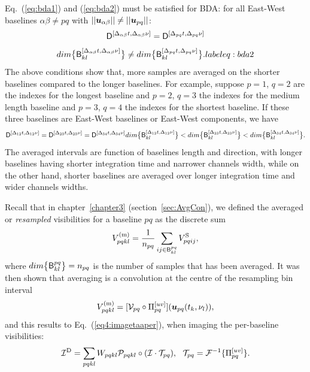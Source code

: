 \documentclass[useAMS,usenatbib]{mn2e}
\begin{document}
Eq.~(\ref{eq:bda1}) and (\ref{eq:bda2}) must be satisfied for BDA: for all East-West baselines 
$\alpha \beta \neq pq$ with $||\bmath{u}_{\alpha \beta}||\neq ||\bmath{u}_{pq}||$:
\begin{equation}
\mathsf{D}^{[\Delta_{\alpha \beta} t, \Delta_{\alpha \beta} \nu]}=\mathsf{D}^{[\Delta_{pq} t, \Delta_{pq} \nu]} \label{eq:bda1}
\end{equation}
\newcommand{\Bdaph}{\mathsf{B}^{[\Delta_{\alpha \beta} t, \Delta_{\alpha \beta} \nu]}}
\begin{equation}
dim \big\{\Bdaph_{kl}\big\} \neq dim \big\{\Bda_{kl}\big\}.label{eq:bda2}
\end{equation}
The above conditions show that, more samples are averaged on the shorter baselines compared to the longer baselines.
For example, suppose $p=1$, $q=2$ are the indexes for the longest baseline and $p=2$, $q=3$ the indexes for the 
medium length baseline
and $p=3$, $q=4$ the indexes for the shortest baseline. If these three baselines are East-West baselines or 
East-West components, we have
\newcommand{\Dbdlong}{\mathsf{D}^{[\Delta_{12} t, \Delta_{12} \nu]}}
\newcommand{\Dbdmedium}{\mathsf{D}^{[\Delta_{23} t, \Delta_{23} \nu]}}
\newcommand{\Dbdshort}{\mathsf{D}^{[\Delta_{34} t, \Delta_{34} \nu]}}
\newcommand{\Bdaphlong}{\mathsf{B}^{[\Delta_{12} t, \Delta_{12} \nu]}}
\newcommand{\Bdaphmedium}{\mathsf{B}^{[\Delta_{23} t, \Delta_{23} \nu]}}
\newcommand{\Bdaphshort}{\mathsf{B}^{[\Delta_{34} t, \Delta_{34} \nu]}}
\begin{equation}
\Dbdlong=\Dbdmedium\\
	=\Dbdshort\\
dim \big\{\Bdaphlong_{kl} \big\}< dim \big\{\Bdaphmedium_{kl}\big\} \\
		    <dim \big\{\Bdaphshort_{kl}\big\}.
\end{equation}
The averaged intervals are function of baselines length and direction, with longer baselines having shorter integration time and
narrower channels width, while on the other hand, shorter baselines are averaged over longer integration time and wider channels widths.

Recall that in chapter~\ref{chapter3} (section~\ref{sec:AvgCon}), we defined the averaged 
or \emph{resampled} visibilities for a baseline $pq$ as  the discrete sum
\begin{equation}
\label{eq:discrete:bdaavg}
V^\mathrm{(m)}_{pqkl} = \frac{1}{n_{pq}} \sum_{ij\in\mathsf{B}_{kl}^{pq}}  V^\mathrm{S}_{pqij},
\end{equation}
where  $dim\big\{\mathsf{B}_{kl}^{pq}\big\}= n_{pq}$ is the number of samples that has been averaged. It was  then 
shown that averaging is a convolution at the centre  of the resampling bin interval
\begin{equation}
V^\mathrm{(m)}_{pqkl} = [ \VV_{pq} \circ \Puv_{pq} ](\bmath{u}_{pq}(t_k,\nu_l)),
\label{eq:avscon}
\end{equation}
and this results to Eq.~(\ref{eq4:imagetaaper}), when 
imaging the per-baseline visibilities:
\begin{equation}
\mathcal{I}^\mathrm{D} =  \sum_{pqkl} W_{pqkl} \mathcal{P}_{pqkl} \circ (\mathcal{I}\cdot\mathcal{T}_{pq}),~~\mathcal{T}_{pq}=\mathcal{F}^{-1}\{ \Pi^{[uv]}_{pq} \}.\label{eq4:imagetaaper}
\end{equation}
\end{document}
